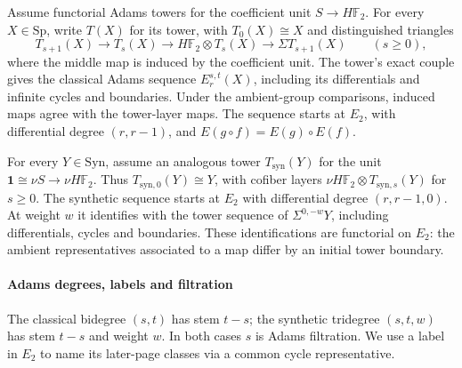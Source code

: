 \begin{definition}
\label{sem:AdamsSynthetic:families}
\label{sem:AdamsSynthetic:classical-coefficient-unit-towers}
\label{sem:AdamsSynthetic:synthetic-coefficient-unit-towers}
Assume functorial Adams towers for the coefficient unit
$S\to H\mathbb F_2$. For every $X\in\mathrm{Sp}$, write $T(X)$ for
its tower, with $T_0(X)\cong X$ and distinguished triangles
\[
 T_{s+1}(X)\longrightarrow T_s(X)
   \longrightarrow H\mathbb F_2\otimes T_s(X)
   \longrightarrow\Sigma T_{s+1}(X)\qquad(s\geq0),
\]
where the middle map is induced by the coefficient unit. The tower's
exact couple gives the classical Adams sequence $E_r^{s,t}(X)$,
including its differentials and infinite cycles and boundaries. Under
the ambient-group comparisons, induced maps agree with the tower-layer maps. The sequence
starts at $E_2$, with differential degree $(r,r-1)$, and
$E(g\circ f)=E(g)\circ E(f)$.

For every $Y\in\mathrm{Syn}$, assume an analogous tower
$T_{\mathrm{syn}}(Y)$ for the unit
$\mathbf1\cong\nu S\to\nu H\mathbb F_2$. Thus $T_{\mathrm{syn},0}(Y)\cong Y$,
with cofiber layers $\nu H\mathbb F_2\otimes T_{\mathrm{syn},s}(Y)$
for $s\geq0$. The synthetic sequence starts at $E_2$ with differential
degree $(r,r-1,0)$.
At weight $w$ it identifies with the tower sequence of
$\Sigma^{0,-w}Y$, including differentials, cycles and boundaries.
These identifications are functorial on $E_2$: the ambient
representatives associated to a map differ by an initial tower boundary.
\end{definition}

\paragraph*{Adams degrees, labels and filtration}
The classical bidegree $(s,t)$ has stem $t-s$; the synthetic tridegree
$(s,t,w)$ has stem $t-s$ and weight $w$. In both cases $s$ is Adams
filtration. We use a label in $E_2$ to name its later-page classes via a
common cycle representative.

